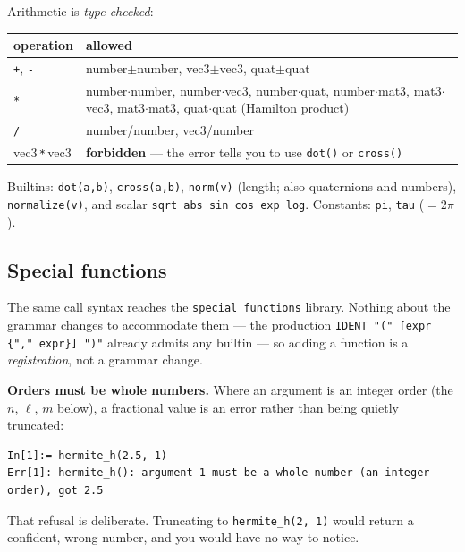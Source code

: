 \documentclass[11pt]{article}
\newcommand{\code}[1]{\texttt{#1}}
\begin{document}
Arithmetic is \emph{type-checked}:
\begin{center}
\begin{tabular}{lp{9.5cm}}
\textbf{operation} & \textbf{allowed}\\\hline
\code{+}, \code{-} & number$\pm$number, vec3$\pm$vec3, quat$\pm$quat\\
\code{*} & number$\cdot$number, number$\cdot$vec3, number$\cdot$quat, number$\cdot$mat3, mat3$\cdot$vec3, mat3$\cdot$mat3, quat$\cdot$quat (Hamilton product)\\
\code{/} & number/number, vec3/number\\
vec3\,\code{*}\,vec3 & \textbf{forbidden} --- the error tells you to use \code{dot()} or \code{cross()}\\
\end{tabular}
\end{center}

Builtins: \code{dot(a,b)}, \code{cross(a,b)}, \code{norm(v)} (length;
also quaternions and numbers), \code{normalize(v)}, and scalar
\code{sqrt abs sin cos exp log}. Constants: \code{pi}, \code{tau}
($=2\pi$).

\subsection{Special functions}\label{sec:specialfns}

The same call syntax reaches the \code{special\_functions} library.
Nothing about the grammar changes to accommodate them --- the production
\code{IDENT "(" [expr \{"," expr\}] ")"} already admits any builtin ---
so adding a function is a \emph{registration}, not a grammar change.

\textbf{Orders must be whole numbers.} Where an argument is an integer
order (the $n$, $\ell$, $m$ below), a fractional value is an error
rather than being quietly truncated:

\begin{lstlisting}
In[1]:= hermite_h(2.5, 1)
Err[1]: hermite_h(): argument 1 must be a whole number (an integer order), got 2.5
\end{lstlisting}

That refusal is deliberate. Truncating to \code{hermite\_h(2, 1)} would
return a confident, wrong number, and you would have no way to notice.
\end{document}
